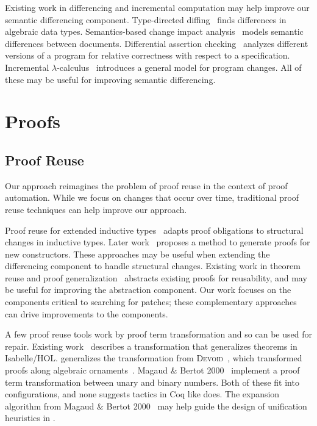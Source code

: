 Existing work in differencing and incremental computation may help 
improve our semantic differencing component.
Type-directed diffing~\cite{Miraldo:2017:TDS:3122975.3122976}
finds differences in algebraic data types.
Semantics-based change impact analysis~\cite{Autexier:2010:SCI:1860559.1860580} models semantic differences
between documents.
Differential assertion checking~\cite{differential-assertion-checking-2} analyzes different
versions of a program for relative correctness with respect to a specification.
Incremental $\lambda$-calculus~\cite{Cai:2014:TCH:2594291.2594304} introduces a general model for program changes.
All of these may be useful for improving semantic differencing.

\section{Proofs}

\subsection*{Proof Reuse}


Our approach reimagines the problem of proof reuse in the context of proof automation.
While we focus on changes that occur over time, traditional proof reuse techniques can help
improve our approach.

Proof reuse for extended inductive types~\cite{Boite2004} adapts proof obligations
to structural changes in inductive types. Later work~\cite{Mulhern06proofweaving} proposes a method
to generate proofs for new constructors. These approaches may be useful when extending the differencing
component to handle structural changes. Existing work in theorem reuse and proof generalization~\cite{Felty1994, pons00, Johnsen2004} abstracts existing proofs for reusability, and may be useful
for improving the abstraction component. %
Our work focuses on the components critical to searching for patches; these complementary approaches
can drive improvements to the components.


A few proof reuse tools work by proof term transformation and so can be used for repair.
Existing work~\cite{Johnsen2004} describes a transformation that generalizes theorems in Isabelle/HOL.
\toolnamec generalizes the transformation from \textsc{Devoid}~\cite{Ringer2019},
which transformed proofs along algebraic ornaments~\cite{mcbride}.
Magaud \& Bertot 2000~\cite{magaud2000changing} implement a proof term transformation between
unary and binary numbers. 
Both of these fit into \toolnamec configurations,
and none suggests tactics in Coq like \toolnamec does.
The expansion algorithm from Magaud \& Bertot 2000~\cite{magaud2000changing} may help guide the design
of unification heuristics in \toolnamec.

